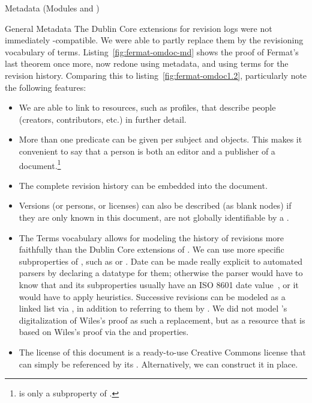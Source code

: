 \begin{tchapter}[id=metadata,short=Metadata]{Metadata (Modules {} and  {})}
\begin{tsection}{General Metadata}
The  Dublin Core extensions for revision logs were not
immediately \rdf-compatible.  We were able to partly replace them by the
revisioning vocabulary of \dcmi terms.  Listing~\ref{fig:fermat-omdoc-md} shows the proof of Fermat's last theorem once more, now redone using \rdfa metadata, and using \dcmi terms for the revision history.  Comparing this to listing~\ref{fig:fermat-omdoc1.2}, particularly note the following features:

\begin{itemize}
\item We are able to link to resources, such as \foaf
  profiles, that describe people (creators, contributors, etc.) in   further detail.
\item More than one predicate can be given per subject and objects.  This makes it   convenient to say that a person is both an editor and a publisher of a   document.\footnote{ is only a subproperty of     .}
\item The complete revision history can be embedded into the document.
\item Versions (or persons, or licenses) can also be described (as blank nodes) if they   are only known in this document, \ie are not globally identifiable by a \uri.
\item The \dcmi Terms vocabulary allows for modeling the history of revisions more   faithfully than the Dublin Core extensions of .  We can use more specific   subproperties of , such as  or   .  Date can be made really explicit to automated parsers by   declaring a datatype for them; otherwise the parser would have to know that    and its subproperties usually have an ISO 8601 date   value~\cite{BirMal:XMLSchema:Datatypes}, or it would have to apply heuristics.   Successive revisions can be modeled as a linked list via   , in addition to referring to them by   .  We did not model 's   digitalization of Wiles's proof as such a replacement, but as a resource that is based   on Wiles's proof via the  and    properties.
\item The license of this document is a ready-to-use Creative Commons license that can   simply be referenced by its \uri.  Alternatively, we can construct it in place.
\end{itemize}


\end{tsection}
\end{tchapter}
